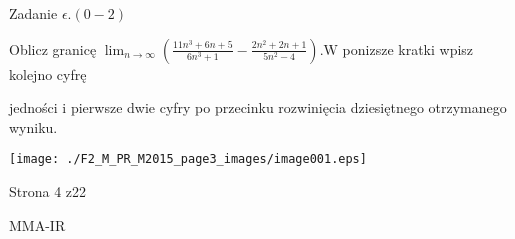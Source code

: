 \documentclass[a4paper,12pt]{article}
\begin{document}
Zadanie $\epsilon.(0-2)$

Oblicz granicę $\displaystyle \lim_{n\rightarrow\infty}(\frac{11n^{3}+6n+5}{6n^{3}+1}-\frac{2n^{2}+2n+1}{5n^{2}-4}). \mathrm{W}$ ponizsze kratki wpisz kolejno cyfrę

jedności i pierwsze dwie cyfry po przecinku rozwinięcia dziesiętnego otrzymanego wyniku.
\begin{center}
\texttt{[image: ./F2\_M\_PR\_M2015\_page3\_images/image001.eps]}
\end{center}
Strona 4 z22

MMA-IR
\end{document}
